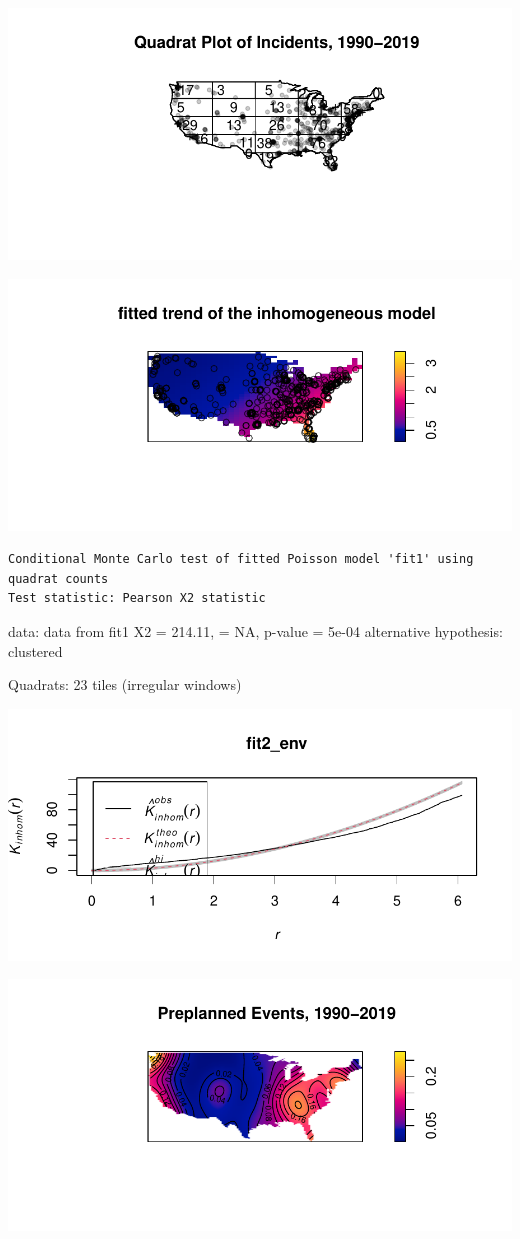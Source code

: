 \documentclass[
  12pt,
]{article}
\begin{document}
\includegraphics{JStevenRaquel_STATS295_Final_files/figure-latex/plot-quadrats-1990-2019-1.pdf}

\includegraphics{JStevenRaquel_STATS295_Final_files/figure-latex/plot-fit1-inhomogeneous-1.pdf}

\begin{verbatim}
Conditional Monte Carlo test of fitted Poisson model 'fit1' using
quadrat counts
Test statistic: Pearson X2 statistic
\end{verbatim}

data: data from fit1 X2 = 214.11, = NA, p-value = 5e-04 alternative
hypothesis: clustered

Quadrats: 23 tiles (irregular windows)

\includegraphics{JStevenRaquel_STATS295_Final_files/figure-latex/plot-fit2-envelope-1.pdf}

\includegraphics{JStevenRaquel_STATS295_Final_files/figure-latex/heatmap-preplanned-1.pdf}
\end{document}
